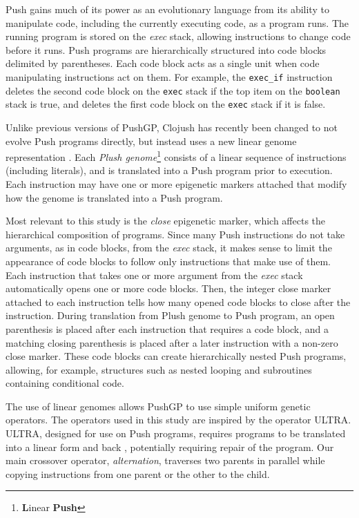 Push gains much of its power as an evolutionary language from its ability to manipulate code, including the currently executing code, as a program runs. The running program is stored on the \textit{exec} stack, allowing instructions to change code before it runs. Push programs are hierarchically structured into code blocks delimited by parentheses. Each code block acts as a single unit when code manipulating instructions act on them. For example, the \texttt{exec\_if} instruction deletes the second code block on the \texttt{exec} stack if the top item on the \texttt{boolean} stack is true, and deletes the first code block on the \texttt{exec} stack if it is false.

Unlike previous versions of PushGP, Clojush has recently been changed to not evolve 
Push programs directly, but instead uses a new linear genome representation 
\citep{Helmuth:2016:GPTP}. Each \textit{Plush genome}\footnote{\textbf{L}inear 
	\textbf{Push}} consists of a linear sequence of instructions (including 
literals), and is translated into a Push program prior to execution. Each 
instruction may have one or more epigenetic markers attached that modify how 
the genome is translated into a Push program.

Most relevant to this study is the \textit{close} epigenetic marker, which 
affects the hierarchical composition of programs. Since many Push instructions 
do not take arguments, as in code blocks, from the \textit{exec} stack, it 
makes sense to limit the appearance of code blocks to follow only instructions 
that make use of them. Each instruction that takes one or more argument from 
the \textit{exec} stack automatically opens one or more code blocks. Then, the 
integer close marker attached to each instruction tells how many opened code 
blocks to close after the instruction. During translation from Plush genome to 
Push program, an open parenthesis is placed after each instruction that 
requires a code block, and a matching closing parenthesis is placed after a 
later instruction with a non-zero close marker. These code blocks can create 
hierarchically nested Push programs, allowing, for example, structures such as 
nested looping and subroutines containing conditional code.

The use of linear genomes allows PushGP to use simple uniform genetic 
operators. The operators used in this study are inspired by the operator ULTRA. 
ULTRA, designed for use on Push programs, requires programs to be translated 
into a linear form and back \citep{Spector:2013:GPTP}, potentially requiring 
repair of the program. Our main crossover operator, \textit{alternation}, 
traverses two parents in parallel while copying instructions from one parent or 
the other to the child.

